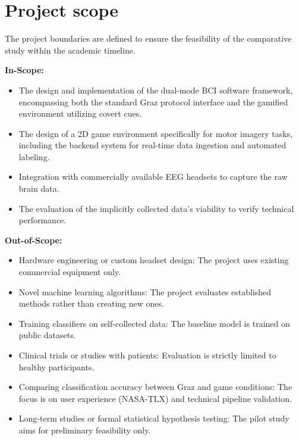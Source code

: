 \documentclass[a4paper, 11pt, openany]{report}
\begin{document}
    \section{Project scope}    
    The project boundaries are defined to ensure the feasibility of the 
    comparative study within the academic timeline.
    
    \textbf{In-Scope:}
    \begin{itemize}
        \item The design and implementation of the dual-mode BCI software framework, encompassing both the standard Graz protocol interface and the gamified environment utilizing covert cues.

        \item The design of a 2D game environment specifically for motor imagery tasks, including the backend system for real-time data ingestion and automated labeling.

        \item Integration with commercially available EEG headsets to capture the raw brain data.

        \item The evaluation of the implicitly collected data's viability to verify technical performance.
    \end{itemize}
    
    \textbf{Out-of-Scope:}
    \begin{itemize}
        \item Hardware engineering or custom headset design: The project uses existing commercial equipment only.

        \item Novel machine learning algorithms: The project evaluates established methods rather than creating new ones.

        \item Training classifiers on self-collected data: The baseline model is trained on public datasets.

        \item Clinical trials or studies with patients: Evaluation is strictly limited to healthy participants.

        \item Comparing classification accuracy between Graz and game conditions: The focus is on user experience (NASA-TLX) and technical pipeline validation.

        \item Long-term studies or formal statistical hypothesis testing: The pilot study aims for preliminary feasibility only.
    \end{itemize}
\end{document}
